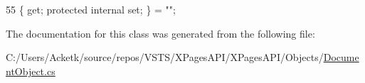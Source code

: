 \begin{DoxyCode}
55 \{ \textcolor{keyword}{get}; \textcolor{keyword}{protected} \textcolor{keyword}{internal} \textcolor{keyword}{set}; \} = \textcolor{stringliteral}{""};
\end{DoxyCode}


The documentation for this class was generated from the following file\+:\begin{DoxyCompactItemize}
\item 
C\+:/\+Users/\+Acketk/source/repos/\+V\+S\+T\+S/\+X\+Pages\+A\+P\+I/\+X\+Pages\+A\+P\+I/\+Objects/\mbox{\hyperlink{_document_object_8cs}{Document\+Object.\+cs}}\end{DoxyCompactItemize}
